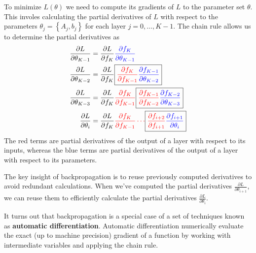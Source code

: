 \documentclass{article}
\begin{document}
To minimize $L(\theta)$ we need to compute its gradients of $L$ to the
parameter set $\theta$. This involes calculating the partial derivatives of
$L$ with respect to the parameters $\theta_j=\left\{A_j,b_j\right\}$ for each
layer $j=0,\ldots,K-1$. The chain rule allows us to determine the partial
derivatives as
$$\begin{aligned}
    \frac{\partial{L}}{\partial{\theta_{K-1}}}&=\frac{\partial{L}}{\partial{f_K}}{\color{blue}\frac{\partial{f_K}}{\partial{\theta_{K-1}}}}
    \\
    \frac{\partial{L}}{\partial{\theta_{K-2}}}&=\frac{\partial{L}}{\partial{f_K}}\boxed{{\color{red}\frac{\partial{f_K}}{\partial{f_{K-1}}}}{\color{blue}\frac{\partial{f_{K-1}}}{\partial{\theta_{K-2}}}}}
    \\
    \frac{\partial{L}}{\partial{\theta_{K-3}}}&=\frac{\partial{L}}{\partial{f_K}}{\color{red}\frac{\partial{f_K}}{\partial{f_{K-1}}}}\boxed{{\color{red}\frac{\partial{f_{K-1}}}{\partial{f_{K-2}}}}{\color{blue}\frac{\partial{f_{K-2}}}{\partial{\theta_{K-3}}}}}
    \\
    \frac{\partial{L}}{\partial{\theta_{i}}}&=\frac{\partial{L}}{\partial{f_K}}{\color{red}\frac{\partial{f_K}}{\partial{f_{K-1}}}\cdots}\boxed{{\color{red}\frac{\partial{f_{i+2}}}{\partial{f_{i+1}}}}{\color{blue}\frac{\partial{f_{i+1}}}{\partial{\theta_{i}}}}}
\end{aligned}$$
The {\color{red}red} terms are partial derivatives of the output of a layer
with respect to its inputs, whereas the {\color{blue}blue} terms are partial
derivatives of the output of a layer with respect to its parameters. 

The key insight of backpropagation is to reuse previously computed derivatives
to avoid redundant calculations. When we've computed the partial derivatives
$\frac{\partial{L}}{\partial{\theta_{i+1}}}$, we can reuse them to efficiently
calculate the partial derivatives
$\frac{\partial{L}}{\partial{\theta}_{i}}$.

It turns out that backpropagation is a special case of a set of techniques
known as \textbf{automatic differentiation}. Automatic differentiation
numerically evaluate the exact (up to machine precision) gradient of a function by working with
intermediate variables and applying the chain rule.
\end{document}
